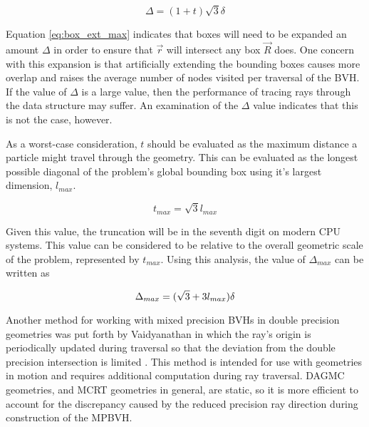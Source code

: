 \begin{equation}
  \Delta = (1 + t)\sqrt{3}\delta
  \label{eq:box_ext_max}
\end{equation}

Equation \eqref{eq:box_ext_max} indicates that boxes will need to be expanded an amount $\Delta$
in order to ensure that $\vec{r}$ will intersect any box $\vec{R}$ does. One
concern with this expansion is that artificially extending the bounding boxes
causes more overlap and raises the average number of nodes visited per traversal
of the BVH. If the value of $\Delta$ is a large value, then the performance of
tracing rays through the data structure may suffer. An examination of the
$\Delta$ value indicates that this is not the case, however.

As a worst-case consideration, $t$ should be evaluated as the maximum distance a
particle might travel through the geometry. This can be evaluated as the longest
possible diagonal of the problem's global bounding box using it's largest
dimension, $l_{max}$.

\begin{equation}
  t_{max} = \sqrt{3} l_{max}
\end{equation}

Given this value, the truncation will be in the seventh digit on modern
CPU systems. This value can be considered to be relative to the overall
geometric scale of the problem, represented by $t_{max}$. Using this analysis,
the value of $\Delta_{max}$ can be written as 

\begin{equation}
  \centering
  \Delta_{max} = (\sqrt{3} + 3 l_{max}) \delta
  \label{eq:box_extension_limit}
\end{equation}

Another method for working with mixed precision BVHs in double precision
geometries was put forth by Vaidyanathan in which the ray's origin is
periodically updated during traversal so that the deviation from the double
precision intersection is limited \cite{Vaidyanathan_2016}. This method is
intended for use with geometries in motion and requires additional computation
during ray traversal. DAGMC geometries, and MCRT geometries in
general, are static, so it is more efficient to account for the 
discrepancy caused by the reduced precision ray direction during
construction of 
the MPBVH.

